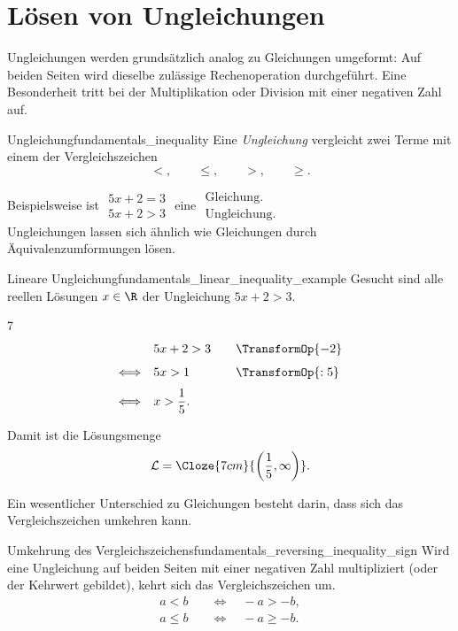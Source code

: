 \section{Lösen von Ungleichungen}
\label{sec:fundamentals_solving_inequalities}

Ungleichungen werden grundsätzlich analog zu Gleichungen umgeformt: Auf beiden
Seiten wird dieselbe zulässige Rechenoperation durchgeführt. Eine Besonderheit
tritt bei der Multiplikation oder Division mit einer negativen Zahl auf.

\begin{DefinitionBox}{Ungleichung}{fundamentals_inequality}
  Eine \emph{Ungleichung}  vergleicht zwei Terme mit
  einem der Vergleichszeichen
  \[
    <,\qquad \leq,\qquad >,\qquad \geq.
  \]
\end{DefinitionBox}

Beispielsweise ist $\begin{array}{c} 5x+2=3 \\ [0.3em] 5x+2>3 \end{array}$ eine
$\begin{array}{l} \text{Gleichung.} \\[0.3em] \text{Ungleichung.} \end{array}$ \\

Ungleichungen lassen sich ähnlich wie Gleichungen durch Äquivalenzumformungen lösen.
\begin{ExampleBox}{Lineare Ungleichung}{fundamentals_linear_inequality_example}
  Gesucht sind alle reellen Lösungen $x\in\R$ der Ungleichung $5x+2>3$.
  \begin{ClozeArea}[25]{7}
    \[
      \begin{array}{r@{\quad}l@{\qquad}l}
        & 5x+2>3 & \TransformOp{-2} \\[0.7em]
        \Longleftrightarrow & 5x>1 & \TransformOp{:5} \\[0.7em]
        \Longleftrightarrow & x>\dfrac15. &
      \end{array}
    \]
  \end{ClozeArea}
  Damit ist die Lösungsmenge
  \[
    \mathcal{L}=\Cloze{7cm}{\left(\frac15,\infty\right)}.
  \]
\end{ExampleBox}

Ein wesentlicher Unterschied zu Gleichungen besteht darin, dass sich das
Vergleichszeichen umkehren kann.
\begin{KeyPointBox}{Umkehrung des Vergleichszeichens}{fundamentals_reversing_inequality_sign}
  Wird eine Ungleichung auf beiden Seiten mit einer negativen Zahl multipliziert (oder der Kehrwert gebildet),
  kehrt sich das Vergleichszeichen um.
  \begin{align*}
      a<b \quad &\Longleftrightarrow \quad -a>-b, \\
      a\leq b \quad &\Longleftrightarrow \quad -a\geq-b.
  \end{align*}
\end{KeyPointBox}


